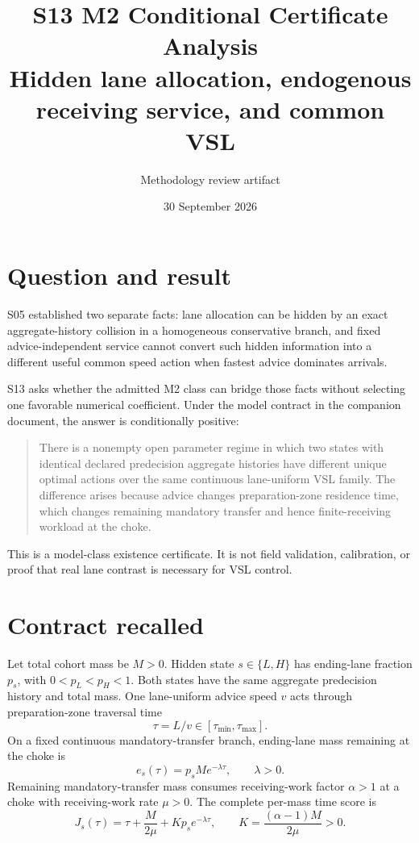 \documentclass[11pt]{article}
\title{S13 M2 Conditional Certificate Analysis\\\large Hidden lane allocation, endogenous receiving service, and common VSL}
\author{Methodology review artifact}
\date{30 September 2026}
\begin{document}
\maketitle

\section{Question and result}

S05 established two separate facts: lane allocation can be hidden by an exact
aggregate-history collision in a homogeneous conservative branch, and fixed
advice-independent service cannot convert such hidden information into a
different useful common speed action when fastest advice dominates arrivals.

S13 asks whether the admitted M2 class can bridge those facts without selecting
one favorable numerical coefficient. Under the model contract in the companion
document, the answer is conditionally positive:

\begin{quote}
There is a nonempty open parameter regime in which two states with identical
declared predecision aggregate histories have different unique optimal actions
over the same continuous lane-uniform VSL family. The difference arises because
advice changes preparation-zone residence time, which changes remaining
mandatory transfer and hence finite-receiving workload at the choke.
\end{quote}

This is a model-class existence certificate. It is not field validation,
calibration, or proof that real lane contrast is necessary for VSL control.

\section{Contract recalled}

Let total cohort mass be \(M>0\). Hidden state \(s\in\{L,H\}\) has ending-lane
fraction \(p_s\), with \(0<p_L<p_H<1\). Both states have the same aggregate
predecision history and total mass. One lane-uniform advice speed \(v\) acts
through preparation-zone traversal time
\[
 \tau=L/v\in[\tau_{\min},\tau_{\max}].
\]
On a fixed continuous mandatory-transfer branch, ending-lane mass remaining at
the choke is
\[
 e_s(\tau)=p_sM e^{-\lambda\tau},\qquad \lambda>0.
\]
Remaining mandatory-transfer mass consumes receiving-work factor \(\alpha>1\)
at a choke with receiving-work rate \(\mu>0\). The complete per-mass time score is
\begin{equation}
 J_s(\tau)=\tau+\frac{M}{2\mu}+Kp_s e^{-\lambda\tau},
 \qquad K=\frac{(\alpha-1)M}{2\mu}>0.
 \label{eq:J}
\end{equation}
\end{document}

